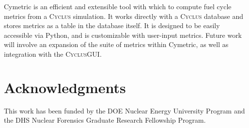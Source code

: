 \documentclass{anstrans}
\newcommand{\cyclus}{\textsc{Cyclus}\xspace}
\begin{document}
Cymetric is an efficient and extensible tool with which to compute fuel cycle metrics from a \cyclus simulation. It works directly with a \cyclus database and stores metrics as a table in the database itself. It is designed to be easily accessible via Python, and is customizable with user-input metrics. Future work will involve an expansion of the suite of metrics within Cymetric, as well as integration with the \cyclus \gls{GUI}. 

\section{Acknowledgments}
This work has been funded by the \gls{DOE} Nuclear Energy University Program and the \gls{DHS} Nuclear Forensics Graduate Research Fellowship Program. 



\end{document}
